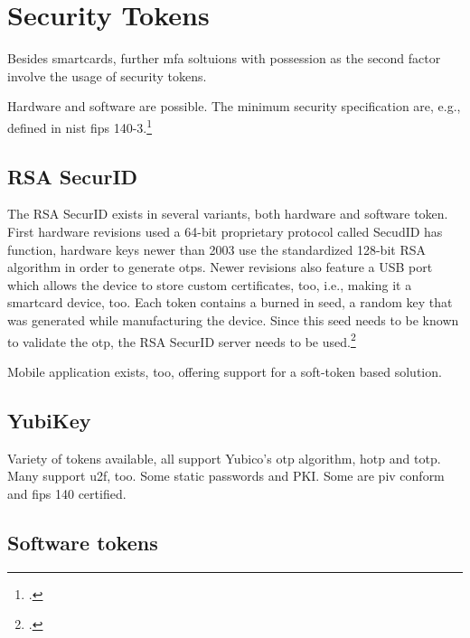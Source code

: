 \section{Security Tokens}

Besides smartcards, further \gls{mfa} soltuions with possession as the second factor involve the usage of security tokens.

Hardware and software are possible. The minimum security specification are, e.g., defined in \gls{nist} \gls{fips} 140-3.\footcites[See][]{FIPS140-3}

\subsection{RSA SecurID}

The RSA SecurID exists in several variants, both hardware and software token. First hardware revisions used a 64-bit proprietary protocol called \flqq SecudID has function\flqq, hardware keys newer than 2003 use the standardized 128-bit RSA algorithm in order to generate \glspl{otp}. Newer revisions also feature a USB port which allows the device to store custom certificates, too, i.e., making it a smartcard device, too. Each token contains a burned in seed, a random key that was generated while manufacturing the device. Since this seed needs to be known to validate the \gls{otp}, the RSA SecurID server needs to be used.\footcites[See][479--480]{eckert-it-sec-9}

Mobile application exists, too, offering support for a soft-token based solution.

\subsection{YubiKey}

Variety of tokens available, all support Yubico's \gls{otp} algorithm, \gls{hotp} and \gls{totp}. Many support \gls{u2f}, too. Some static passwords and PKI. Some are \gls{piv} conform and \gls{fips} 140 certified.

\subsection{Software tokens}